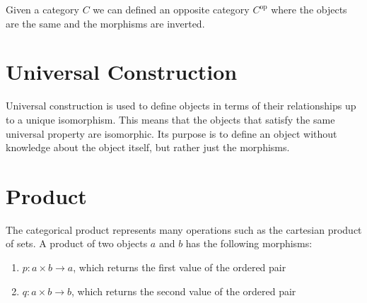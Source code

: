 \documentclass[a4paper]{article}
\newcommand{\opp}[1]{{#1}^{\text{op}}}
\begin{document}
Given a category \(C\) we can defined an opposite category \(\opp{C}\)
where the objects are the same and the morphisms are inverted.

\begin{minipage}{0.5\textwidth}
    \begin{center}
    \end{center}
\end{minipage}
\begin{minipage}{0.5\textwidth}
    \begin{center}
    \end{center}
\end{minipage}

\pagebreak

\section{Universal Construction}

Universal construction is used to define objects in terms of their
relationships up to a unique isomorphism.
This means that the objects that satisfy the same universal property
are isomorphic.
Its purpose is to define an object without knowledge about the object itself,
but rather just the morphisms.

\section{Product}

The categorical product represents many operations
such as the cartesian product of sets.
A product of two objects \(a\) and \(b\) has the following
morphisms:
\begin{enumerate}
    \item \(p:a\times b \to a\), which returns the first value of the ordered pair
    \item \(q:a\times b \to b\), which returns the second value of the ordered pair
\end{enumerate}
\end{document}
